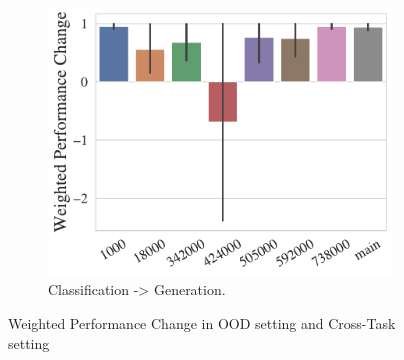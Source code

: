 \begin{figure}[t!]
    \begin{subfigure}[b]{0.3\textwidth}
        \centering
    \includegraphics[width=\the\columnwidth]{figures/fig_files/cross-task/weighted_perf_change_clas_to_gen.pdf}
        \caption{Classification -> Generation.}
        \label{fig:perf-change-class-to-gen}
    \end{subfigure}
    \caption{Weighted Performance Change in OOD setting and Cross-Task setting }
    \label{fig:perf-change}
\end{figure}
